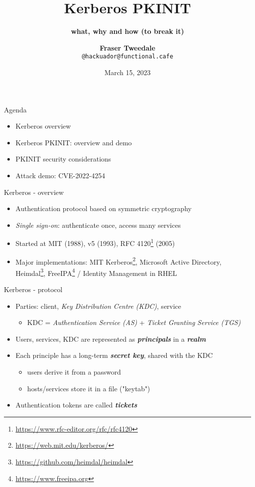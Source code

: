 \documentclass[ignorenonframetext,aspectratio=169,12pt]{beamer}
\title{\bf Kerberos PKINIT}
\subtitle{\bf what, why and how (to break it)}
\author{{\bf Fraser Tweedale}\\
    \texttt{@hackuador@functional.cafe}\\
    \bigskip
    \def\svgwidth{4cm}
    }
\date{March 15, 2023}
\begin{document}
\frame{\titlepage}

\begin{frame}{Agenda}
\protect\hypertarget{agenda}{}

\begin{itemize}
    \item Kerberos overview
    \item Kerberos PKINIT: overview and demo
    \item PKINIT security considerations
    \item Attack demo: CVE-2022-4254
\end{itemize}

\end{frame}


\begin{frame}{Kerberos - overview}
\protect\hypertarget{kerberos-overview}{}
\begin{itemize}
    \item Authentication protocol based on symmetric cryptography
    \item {\em Single sign-on}: authenticate once, access many services
    \item Started at MIT (1988), v5 (1993),
        RFC 4120\footnote{\url{https://www.rfc-editor.org/rfc/rfc4120}} (2005)
    \item Major implementations:
        MIT Kerberos\footnote{\url{https://web.mit.edu/kerberos/}},
        Microsoft Active Directory,
        Heimdal\footnote{\url{https://github.com/heimdal/heimdal}},
        FreeIPA\footnote{\url{https://www.freeipa.org}} / Identity Management in RHEL
\end{itemize}
\end{frame}


\begin{frame}{Kerberos - protocol}
\protect\hypertarget{kerberos-protocol}{}
\begin{itemize}
    \item Parties: client, {\em Key Distribution Centre (KDC)}, service
        \begin{itemize}
            \item KDC = {\em Authentication Service (AS)} +
                {\em Ticket Granting Service (TGS)}
        \end{itemize}
    \item Users, services, KDC are represented as \textbf{\em principals} in a \textbf{\em realm}
    \item Each principle has a long-term \textbf{\em secret key}, shared with the KDC
        \begin{itemize}
            \item users derive it from a password
            \item hosts/services store it in a file ("keytab")
        \end{itemize}
    \item Authentication tokens are called \textbf{\em tickets}
\end{itemize}
\end{frame}
\end{document}
